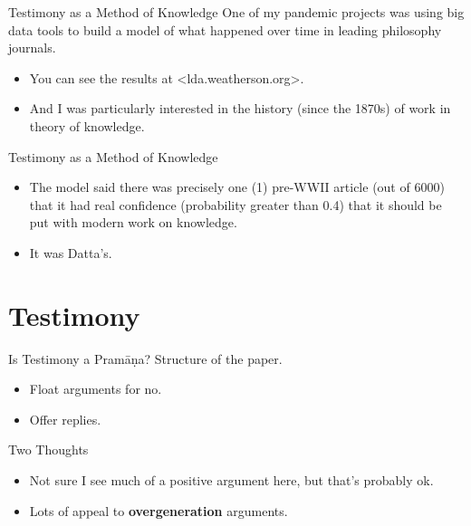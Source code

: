 \documentclass[
  17pt,
  letterpaper,
  ignorenonframetext,
  aspectratio=169,
  handout]{beamer}
\providecommand{\tightlist}{%
  \setlength{\itemsep}{0pt}\setlength{\parskip}{0pt}}\usepackage{longtable,booktabs,array}
\begin{document}
\begin{frame}{Testimony as a Method of Knowledge}
\protect\hypertarget{testimony-as-a-method-of-knowledge-1}{}
One of my pandemic projects was using big data tools to build a model of
what happened over time in leading philosophy journals.

\begin{itemize}[<+->]
\tightlist
\item
  You can see the results at \textless lda.weatherson.org\textgreater.
\item
  And I was particularly interested in the history (since the 1870s) of
  work in theory of knowledge.
\end{itemize}
\end{frame}

\begin{frame}{Testimony as a Method of Knowledge}
\protect\hypertarget{testimony-as-a-method-of-knowledge-2}{}
\begin{itemize}[<+->]
\tightlist
\item
  The model said there was precisely one (1) pre-WWII article (out of
  6000) that it had real confidence (probability greater than 0.4) that
  it should be put with modern work on knowledge.
\item
  It was Datta's.
\end{itemize}
\end{frame}

\hypertarget{testimony}{%
\section{Testimony}\label{testimony}}

\begin{frame}{Is Testimony a Pramāṇa?}
\protect\hypertarget{is-testimony-a-pramux101ux1e47a}{}
Structure of the paper.

\begin{itemize}[<+->]
\tightlist
\item
  Float arguments for no.
\item
  Offer replies.
\end{itemize}
\end{frame}

\begin{frame}{Two Thoughts}
\protect\hypertarget{two-thoughts}{}
\begin{itemize}[<+->]
\tightlist
\item
  Not sure I see much of a positive argument here, but that's probably
  ok.
\item
  Lots of appeal to \textbf{overgeneration} arguments.
\end{itemize}
\end{frame}
\end{document}
